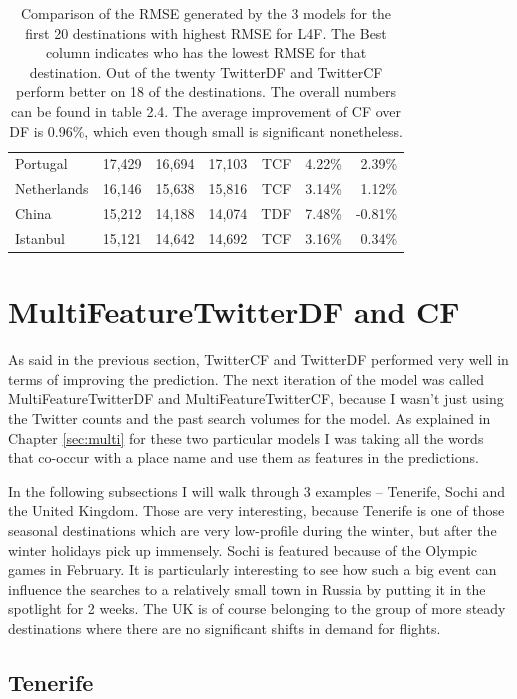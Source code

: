 \documentclass[minf,twoside,singlespacing,parskip,frontabs,notimes,11pt]{infthesis}
\begin{document}
\begin{table}[p]
\begin{center}
\begin{tabular}{ l | r | r | r | r | r | r }
Portugal & 17,429 & 16,694 & 17,103 & TCF & 4.22\% & 2.39\%\\
Netherlands & 16,146 & 15,638 & 15,816 & TCF & 3.14\% & 1.12\%\\
China & 15,212 & 14,188 & 14,074 & TDF & 7.48\% & -0.81\%\\
Istanbul & 15,121 & 14,642 & 14,692 & TCF & 3.16\% & 0.34\%
\end{tabular}
\end{center}
\caption{Comparison of the RMSE generated by the 3 models for the first 20 destinations with highest RMSE for L4F. The Best column indicates who has the lowest RMSE for that destination. Out of the twenty TwitterDF and TwitterCF perform better on 18 of the destinations. The overall numbers can be found in table 2.4. The average improvement of CF over DF is 0.96\%, which even though small is significant nonetheless. }
\label{big-table}
\end{table}


\newpage
\section{MultiFeatureTwitterDF and CF}
\label{sec:features}

As said in the previous section, TwitterCF and TwitterDF performed very well in terms of improving the prediction. The next iteration of the model was called MultiFeatureTwitterDF and MultiFeatureTwitterCF, because I wasn't just using the Twitter counts and the past search volumes for the model. As explained in Chapter \ref{sec:multi} for these two particular models I was taking all the words that co-occur with a place name and use them as features in the predictions. 

In the following subsections I will walk through 3 examples -- Tenerife, Sochi and the United Kingdom. Those are very interesting, because Tenerife is one of those seasonal destinations which are very low-profile during the winter, but after the winter holidays pick up immensely. Sochi is featured because of the Olympic games in February. It is particularly interesting to see how such a big event can influence the searches to a relatively small town in Russia by putting it in the spotlight for 2 weeks. The UK is of course belonging to the group of more steady destinations where there are no significant shifts in demand for flights. 

\subsection{Tenerife}
\end{document}
